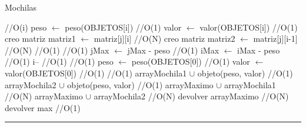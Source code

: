 \begin{algorithm}[H]
\caption{Mochilas}
\begin{algorithmic}[1]
 \hfill //O(i)
\state peso $\gets$ peso(OBJETOS[i]) \hfill //O(1)
\state valor $\gets$ valor(OBJETOS[i]) \hfill //O(1)
\state creo matriz matriz1 $\gets$ matriz[j][i] \hfill //O(N)
\state creo matriz matriz2 $\gets$ matriz[j][i-1] \hfill //O(N)
 \hfill //O(1)
 \hfill //O(1)
\state jMax $\gets$ jMax - peso \hfill //O(1)
\Else
\state iMax $\gets$ iMax - peso \hfill //O(1)
\endif
\endif
\state i-- \hfill //O(1)
\endwhile
{} \hfill //O(1)
\state peso $\gets$ peso(OBJETOS[0]) \hfill //O(1)
\state valor $\gets$ valor(OBJETOS[0]) \hfill //O(1)
 \hfill //O(1)
\state arrayMochila1 $\cup$ objeto(peso, valor) \hfill //O(1)
\Else
\state arrayMochila2 $\cup$ objeto(peso, valor) \hfill //O(1)
\endif
\endif
\state arrayMaximo $\cup$ arrayMochila1 \hfill //O(N)
\state arrayMaximo $\cup$ arrayMochila2 \hfill //O(N)
\state devolver arrayMaximo \hfill //O(N)
\state devolver max \hfill //O(1)
\EndFunction 
\end{algorithmic}
\hrule
{}
\end{algorithm}




